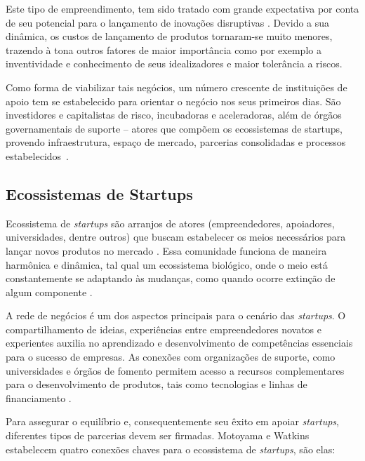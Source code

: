 \documentclass{sig-alternate-05-2015}
\begin{document}
Este tipo de empreendimento, tem sido tratado com grande expectativa por conta de seu potencial para o lançamento de inovações disruptivas \cite{weiblen-chesbrough-2016}. Devido a sua dinâmica, os custos de lançamento de produtos tornaram-se muito menores, trazendo à tona outros fatores de maior importância como por exemplo a inventividade e conhecimento de seus idealizadores e maior tolerância a riscos. 

Como forma de viabilizar tais negócios, um número crescente de instituições de apoio tem se estabelecido para orientar o negócio nos seus primeiros dias. São investidores e capitalistas de risco, incubadoras e aceleradoras, além de órgãos governamentais de suporte -- atores que compõem os ecossistemas de startups, provendo infraestrutura, espaço de mercado, parcerias consolidadas e processos estabelecidos~\cite{anthony-12}.

\subsection{Ecossistemas de {\subsecit Startups}}

Ecossistema de \textit{startups} são arranjos de atores (empreendedores, apoiadores, universidades, dentre outros) que buscam estabelecer os meios necessários para lançar novos produtos no mercado \cite{torres-souza-2016}. Essa comunidade funciona de maneira harmônica e dinâmica, tal qual um ecossistema biológico, onde o meio está constantemente se adaptando às mudanças, como  quando ocorre extinção de algum componente \cite{torres-souza-2016}. 

A rede de negócios é um dos aspectos principais para o cenário das \textit{startups}. O compartilhamento de ideias, experiências entre empreendedores novatos e experientes auxilia no aprendizado e desenvolvimento de competências essenciais para o sucesso de empresas. As conexões com organizações de suporte, como universidades e órgãos de fomento permitem acesso a recursos complementares para o desenvolvimento de produtos, tais como tecnologias e linhas de financiamento \cite{isenberg-2011} \cite{motoyama-waltins-2014} \cite{torres-souza-2016}. 

Para assegurar o equilíbrio e, consequentemente seu êxito em apoiar \textit{startups}, diferentes tipos de parcerias devem ser firmadas. Motoyama e Watkins \cite{motoyama-waltins-2014} estabelecem quatro conexões chaves para o ecossistema de \textit{startups}, são elas:
\end{document}
